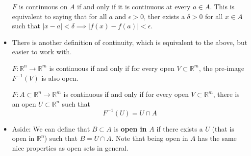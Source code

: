 \begin{itemize}
\begin{definition}
              $F$ is continuous on $A$ if and only if it is continuous at every $a\in A$. This is equivalent to saying that for all $a$ and $\epsilon >0$, ther exists a $\delta > 0$ for all $x \in A$ such that $|x-a|<\delta \implies |f(x)-f(a)|<\epsilon.$
          \end{definition}
    \item There is another definition of continuity, which is equivalent to the above, but easier to work with.
          \begin{theorem}
              $F:\mathbb{R}^n\rightarrow \mathbb{R}^m$ is continuous if and only if for every open $V\subset \mathbb{R}^m$, the pre-image $F^{-1}(V)$ is also open.
          \end{theorem}
          \begin{theorem}
              $F:A\subset \mathbb{R}^n \rightarrow \mathbb{R}^m$ is continuous if and only if for every open $V \subset \mathbb{R}^m$, there is an open $U \subset \mathbb{R}^n$ such that
              \begin{equation}
                  F^{-1}(U) = U \cap A
              \end{equation}
          \end{theorem}
          \item Aside: We can define that $B\subset A$ is \textbf{open in $A$} if there exists a $U$ (that is open in $\mathbb{R}^n$) such that $B=U\cap A$. Note that being open in $A$ has the same nice properties as open sets in general. 
\end{itemize}